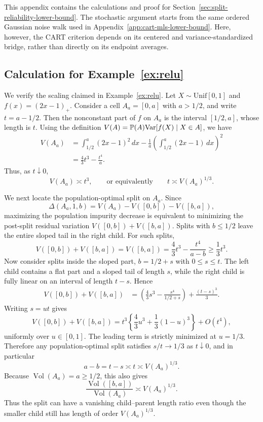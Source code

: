 \documentclass[11pt]{article}
\theoremstyle{plain}
\theoremstyle{definition}
\theoremstyle{remark}
\theoremstyle{plain}
\renewcommand{\P}{\mathbb{P}}
\newcommand{\Var}{\textnormal{Var}}
\DeclareMathOperator{\Vol}{Vol}
\newcommand{\1}{\mathbbm{1}}
\begin{document}
This appendix contains the calculations and proof for
Section~\ref{sec:split-reliability-lower-bound}. The stochastic argument
starts from the same ordered Gaussian noise walk used in
Appendix~\ref{app:cart-mls-lower-bound}. Here, however, the CART criterion
depends on its centered and variance-standardized bridge, rather than
directly on its endpoint averages.

\subsection{Calculation for Example~\ref{ex:relu}}
\label{app:relu-end-cut-calculation}

We verify the scaling claimed in Example~\ref{ex:relu}. Let
$X\sim\mathrm{Unif}[0,1]$ and $f(x)=(2x-1)_+$. Consider a cell
$A_a=[0,a]$ with $a>1/2$, and write $t=a-1/2$. Then the nonconstant part of
$f$ on $A_a$ is the interval $[1/2,a]$, whose length is $t$.
Using the definition $V(A)=\P(A)\Var[f(X)\mid X\in A]$, we have
\begin{align*}
V(A_a)
&=
\int_{1/2}^a (2x-1)^2\,dx
-
\frac{1}{a}\left(\int_{1/2}^a (2x-1)\,dx\right)^2  \\
&=
\frac{4}{3}t^3-\frac{t^4}{a}.
\end{align*}
Thus, as $t\downarrow0$,
\begin{equation}\label{eq:relu-V-tail}
    V(A_a)\asymp t^3,
    \qquad\text{or equivalently}\qquad
    t\asymp V(A_a)^{1/3}.
\end{equation}

We next locate the population-optimal split on $A_a$. Since
\[
\Delta(A_a,1,b)
=V(A_a)-V([0,b])-V([b,a]),
\]
maximizing the population impurity decrease is equivalent to minimizing the
post-split residual variation $V([0,b])+V([b,a])$. Splits with
$b\le 1/2$ leave the entire sloped tail in the right child. For such splits,
\[
V([0,b])+V([b,a])
=V([b,a])
=\frac{4}{3}t^3-\frac{t^4}{a-b}
\ge \frac{1}{3}t^3.
\]
Now consider splits inside the sloped part, $b=1/2+s$ with $0\le s\le t$.
The left child contains a flat part and a sloped tail of length $s$, while the
right child is fully linear on an interval of length $t-s$. Hence
\begin{align*}
V([0,b])+V([b,a])
&=
\left(\frac{4}{3}s^3-\frac{s^4}{1/2+s}\right)
+\frac{(t-s)^3}{3}.
\end{align*}
Writing $s=ut$ gives
\[
V([0,b])+V([b,a])
=t^3\left\{\frac{4}{3}u^3+\frac{1}{3}(1-u)^3\right\}
 +O(t^4),
\]
uniformly over $u\in[0,1]$. The leading term is strictly minimized at
$u=1/3$. Therefore any population-optimal split satisfies
$s/t\to1/3$ as $t\downarrow0$, and in particular
\[
    a-b=t-s\asymp t\asymp V(A_a)^{1/3}.
\]
Because $\Vol(A_a)=a\ge1/2$, this also gives
\[
    \frac{\Vol([b,a])}{\Vol(A_a)}
    \asymp V(A_a)^{1/3}.
\]
Thus the split can have a vanishing child--parent length ratio even though the
smaller child still has length of order $V(A_a)^{1/3}$.
\end{document}
